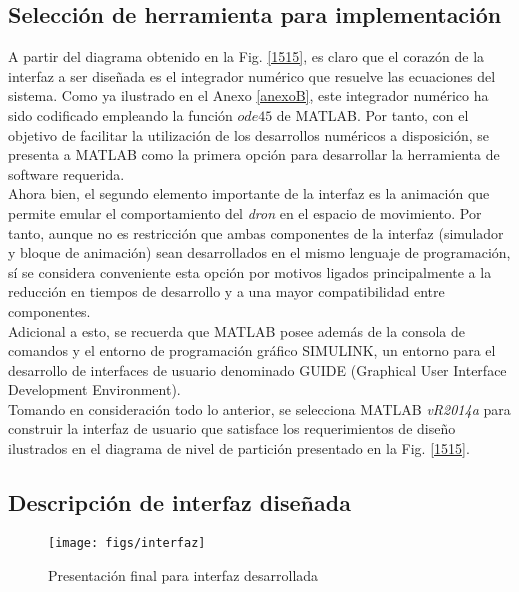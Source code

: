 \subsection*{Selección de herramienta para implementación}
A partir del diagrama obtenido en la Fig. \ref{1515}, es claro que el corazón de la interfaz a ser diseñada es el integrador numérico que resuelve las ecuaciones del sistema. Como ya ilustrado en el Anexo \ref{anexoB}, este integrador numérico ha sido codificado empleando la función $ode45$ de MATLAB. Por tanto, con el objetivo de facilitar la utilización de los desarrollos numéricos a disposición, se presenta a MATLAB como la primera opción para desarrollar la herramienta de software requerida.\\

Ahora bien, el segundo elemento importante de la interfaz es la animación que permite emular el comportamiento del \emph{dron} en el espacio de movimiento. Por tanto, aunque no es restricción que ambas componentes de la interfaz (simulador y bloque de animación) sean desarrollados en el mismo lenguaje de programación, sí se considera conveniente esta opción por motivos ligados principalmente a la reducción en tiempos de desarrollo y a una mayor compatibilidad entre componentes.\\

Adicional a esto, se recuerda que MATLAB posee además de la consola de comandos y el entorno de programación gráfico SIMULINK, un entorno para el desarrollo de interfaces de usuario denominado GUIDE (Graphical User Interface Development Environment).\\

Tomando en consideración todo lo anterior, se selecciona MATLAB \emph{vR2014a} para construir la interfaz de usuario que satisface los requerimientos de diseño ilustrados en el diagrama de nivel de partición presentado en la Fig. \ref{1515}.

\subsection*{Descripción de interfaz diseñada}
\begin{figure}
\centering
\caption[]{Presentación final para interfaz desarrollada}\label{siete}
\texttt{[image: figs/interfaz]}
\end{figure}

